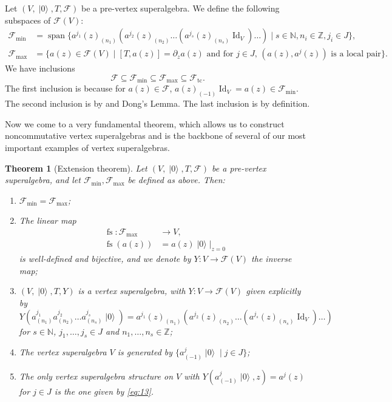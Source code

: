 \documentclass[a4paper, 12pt, reqno]{amsart}
\newtheorem{theorem}{Theorem}[section]
\theoremstyle{remark}
\DeclareMathOperator{\Id}{Id}
\DeclareMathOperator{\vspan}{span}
\DeclareMathOperator{\vac}{|0\rangle}
\DeclareMathOperator{\fs}{fs}
\DeclareMathOperator{\tc}{tc}
\begin{document}
Let $(V, \vac, T, \mathcal{F})$ be a pre-vertex superalgebra.
We define the following subspaces of $\mathcal{F}(V)$:
\begin{align*}
  \mathcal{F}_{\min} &= \vspan\{a^{j_1}(z)_{(n_1)}(a^{j_2}(z)_{(n_2)}\dots(a^{j_s}(z)_{(n_s)}\Id_V)\dots) \mid s \in \mathbb{N}, n_i \in \mathbb{Z}, j_i \in J\}, \\
  \mathcal{F}_{\max} &= \{a(z) \in \mathcal{F}(V) \mid \text{$[T, a(z)] = \partial_za(z)$ and for $j \in J$, $(a(z), a^j(z))$ is a local pair}\}.
\end{align*}
We have inclusions
\begin{equation*}
  \mathcal{F} \subseteq \mathcal{F}_{\min} \subseteq \mathcal{F}_{\max} \subseteq \mathcal{F}_{\tc}.
\end{equation*}
The first inclusion is because for $a(z) \in \mathcal{F}$, $a(z)_{(-1)}\Id_V = a(z) \in \mathcal{F}_{\min}$.
The second inclusion is by  and Dong's Lemma.
The last inclusion is by definition.

Now we come to a very fundamental theorem, which allows us to construct noncommutative vertex superalgebras and is the backbone of several of our most important examples of vertex superalgebras.

\begin{theorem}[Extension theorem]
  \label{thr:18}
  Let $(V, \vac, T, \mathcal{F})$ be a pre-vertex superalgebra, and let $\mathcal{F}_{\min}, \mathcal{F}_{\max}$ be defined as above.
  Then:
  \begin{enumerate}
  \item $\mathcal{F}_{\min} = \mathcal{F}_{\max}$;
  \item The linear map
    \begin{align*}
      \fs: \mathcal{F}_{\max} &\to V, \\
      \fs(a(z)) &= a(z)\vac|_{z = 0}
    \end{align*}
    is well-defined and bijective, and we denote by $Y: V \to \mathcal{F}(V)$ the inverse map;
  \item $(V, \vac, T, Y)$ is a vertex superalgebra, with $Y: V \to \mathcal{F}(V)$ given explicitly by
    \begin{equation}
      \label{eq:13}
      Y(a^{j_1}_{(n_1)}a^{j_2}_{(n_2)}\dots a^{j_s}_{(n_s)}\vac) = a^{j_1}(z)_{(n_1)}(a^{j_2}(z)_{(n_2)}\dots(a^{j_s}(z)_{(n_s)}\Id_V)\dots)
    \end{equation}
    for $s \in \mathbb{N}$, $j_1, \dots, j_s \in J$ and $n_1, \dots, n_s \in \mathbb{Z}$;
  \item The vertex superalgebra $V$ is generated by $\{a^j_{(-1)}\vac \mid j \in J\}$;
  \item The only vertex superalgebra structure on $V$ with $Y(a^j_{(-1)}\vac, z) = a^j(z)$ for $j \in J$ is the one given by \eqref{eq:13}.
  \end{enumerate}
\end{theorem}
\end{document}
